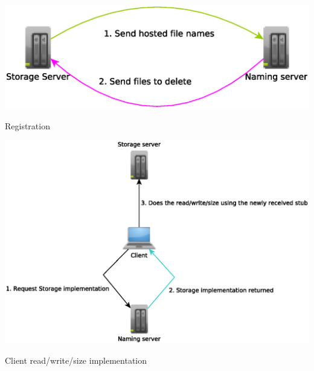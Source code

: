 \documentclass [10pt, a4paper]{article}
\begin{document}
\begin {diagram}
\begin {center}
\includegraphics[scale=0.6]{register.eps}
\end {center}
\caption {Registration}
\end {diagram}
\begin {diagram}
\begin {center}
\includegraphics[scale=0.6]{naming.eps}
\end {center}
\caption {Client read/write/size implementation}
\end {diagram}
\end{document}
